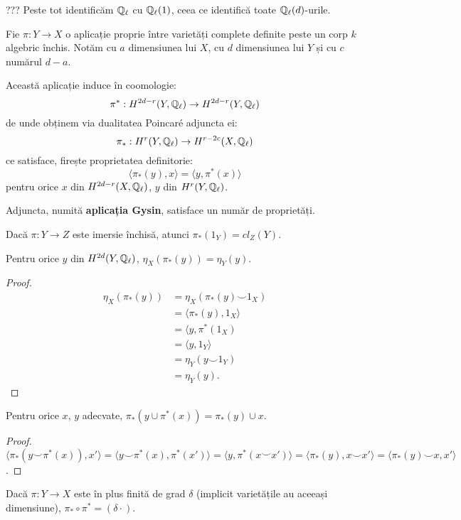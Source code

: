 \documentclass[13pt,openany]{book}
\begin{document}
??? Peste tot identificăm $\mathbb{Q}_\ell$ cu $\mathbb{Q}_\ell(1)$, ceea ce identifică toate $\mathbb{Q}_\ell(d)$-urile.

Fie $\pi : Y \rightarrow X$ o aplicație proprie între varietăți complete definite peste un corp $k$ algebric închis. Notăm cu $a$ dimensiunea lui $X$, cu $d$ dimensiunea lui $Y$ și cu $c$ numărul $d-a$.

Această aplicație induce în coomologie:
$$\pi^*: H^{2d-r}(Y,\mathbb{Q}_\ell) \rightarrow H^{2d-r}(Y,\mathbb{Q}_\ell)$$
de unde obținem via dualitatea Poincaré adjuncta ei:
$$\pi_* : H^r(Y,\mathbb{Q}_\ell) \rightarrow H^{r-2c}(X,\mathbb{Q}_\ell)$$
ce satisface, firește proprietatea definitorie:
$$\langle \pi_*(y),x \rangle=\langle y,\pi^*(x)\rangle$$
pentru orice $x$ din $H^{2d-r}(X,\mathbb{Q}_\ell)$, $y$ din $H^r(Y,\mathbb{Q}_\ell)$.

Adjuncta, numită {\bf aplicația Gysin}, satisface un număr de proprietăți.

\begin{propr}
Dacă $\pi : Y \rightarrow Z$ este imersie închisă, atunci $\pi_*(1_Y)=cl_Z(Y)$.
\end{propr}

\begin{propr}
Pentru orice $y$ din $H^{2d}(Y,\mathbb{Q}_\ell)$, $\eta_X(\pi_*(y))=\eta_Y(y)$.
\end{propr}

\begin{proof}
\begin{align*}
\eta_X(\pi_*(y))&=\eta_X(\pi_*(y)\smile 1_X)\\
&=\langle \pi_*(y), 1_X \rangle \\
&= \langle y, \pi^*(1_X) \\
&= \langle y, 1_Y \rangle \\
&= \eta_Y (y \smile 1_Y) \\
&= \eta_Y(y).
\end{align*}
\end{proof}

\begin{propr}
Pentru orice $x$, $y$ adecvate, $\pi_*(y \cup \pi^*(x)) = \pi_*(y) \cup x$.
\end{propr}

\begin{proof}
$\langle \pi_*(y \smile \pi^*(x)), x' \rangle = \langle y \smile \pi^*(x), \pi^*(x') \rangle = \langle y, \pi^*(x \smile x') \rangle = \langle \pi_*(y),x\smile x' \rangle = \langle \pi_*(y) \smile x, x' \rangle$.
\end{proof}

\begin{propr}
Dacă $\pi:Y \rightarrow X$ este în plus finită de grad $\delta$ (implicit varietățile au aceeași dimensiune), $\pi_* \circ \pi^* = (\delta \cdot)$.
\end{propr}
\end{document}
